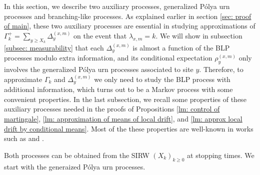 \documentclass[twoside,12pt,a4paper]{article}
\numberwithin{equation}{section}
\begin{document}
	In this section, we describe two auxiliary processes, generalized P\'{o}lya urn processes and branching-like processes. As explained earlier in section \ref{sec: proof of main}, these two auxiliary processes are essential in studying approximations of $\Gamma_k^+= \sum_{y\geq X_k} \Delta_{y}^{(x,m)}$ on the event that $\lambda_{x,m} = k$. We will show in subsection \ref{subsec: measurability} that each $\Delta^{(x,m)}_{y}$ is almost a function of the BLP processes modulo extra information, and its conditional expectation $\rho^{(x,m)}_{y}$ only involves the generalized P\'{o}lya urn processes associated to site $y$. Therefore, to approximate $\Gamma_k$ and $\Delta_{y}^{(x,m)}$ we only need to study the BLP process with additional information, which turns out to be a Markov process with some convenient properties. In the last subsection, we recall some properties of these auxiliary processes needed in the proofs of Propositions \ref{lm: control of martingale}, \ref{lm: approximation of means of local drift}, and \ref{lm: approx local drift by conditional means}. Most of the these properties are well-known in works such as \cite{KP16} and \cite{KMP22}. 
	
	Both processes can be obtained from the SIRW $(X_k)_{k\geq 0}$ at stopping times. We start with the generaized P\'{o}lya urn processes. 
\end{document}

